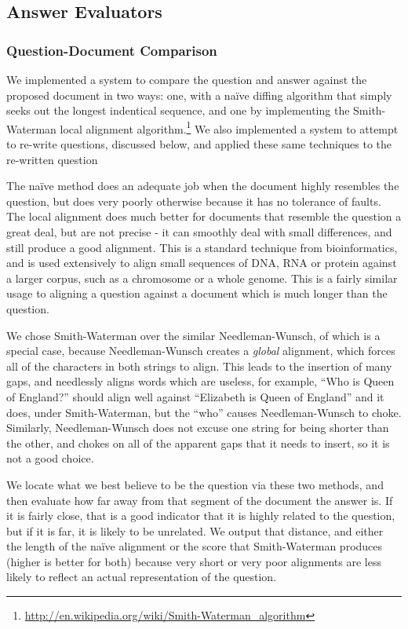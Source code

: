 \documentclass{article}
\begin{document}
\subsection{Answer Evaluators}

\subsubsection{Question-Document Comparison}

We implemented a system to compare the question and answer against the proposed
document in two ways:  one, with a na\"ive diffing algorithm that simply seeks
out the longest indentical sequence, and one by implementing the Smith-Waterman
local alignment
algorithm.\footnote{\url{http://en.wikipedia.org/wiki/Smith-Waterman_algorithm}}
We also implemented a system to attempt to re-write questions, discussed below,
and applied these same techniques to the re-written question

The na\"ive method does an adequate job when the document highly resembles the
question, but does very poorly otherwise because it has no tolerance of faults.
The local alignment does much better for documents that resemble the question a
great deal, but are not precise - it can smoothly deal with small differences,
and still produce a good alignment.  This is a standard technique from
bioinformatics, and is used extensively to align small sequences of DNA, RNA or
protein against a larger corpus, such as a chromosome or a whole genome.  This
is a fairly similar usage to aligning a question against a document which is
much longer than the question.

We chose Smith-Waterman over the similar Needleman-Wunsch, of which is a special
case, because Needleman-Wunsch creates a \emph{global} alignment, which forces
all of the characters in both strings to align.  This leads to the insertion of
many gaps, and needlessly aligns words which are useless, for example, ``Who is
Queen of England?'' should align well against ``Elizabeth is Queen of England''
and it does, under Smith-Waterman, but the ``who'' causes Needleman-Wunsch to
choke.  Similarly, Needleman-Wunsch does not excuse one string for being shorter
than the other, and chokes on all of the apparent gaps that it needs to insert,
so it is not a good choice.

We locate what we best believe to be the question via these two methods, and
then evaluate how far away from that segment of the document the answer is.  If
it is fairly close, that is a good indicator that it is highly related to the
question, but if it is far, it is likely to be unrelated.  We output that
distance, and either the length of the na\"ive alignment or the score that
Smith-Waterman produces (higher is better for both) because very short or very
poor alignments are less likely to reflect an actual representation of the
question.
\end{document}
